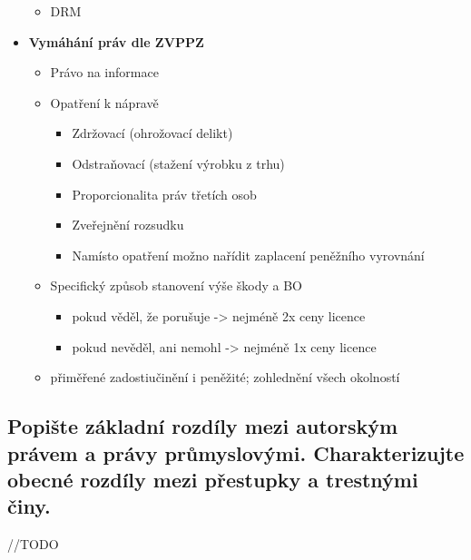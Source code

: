 \begin{itemize}
\begin{itemize}
\begin{itemize}
        \end{itemize}
        \item DRM
    \end{itemize}
    \item\textbf{Vymáhání práv dle ZVPPZ}
    \begin{itemize}
        \item Právo na informace
        \item Opatření k nápravě
        \begin{itemize}
            \item Zdržovací (ohrožovací delikt)
            \item Odstraňovací (stažení výrobku z trhu)
            \item Proporcionalita práv třetích osob
            \item Zveřejnění rozsudku
            \item Namísto opatření možno nařídit zaplacení peněžního vyrovnání
        \end{itemize}
        \item Specifický způsob stanovení výše škody a BO
        \begin{itemize}
            \item pokud věděl, že porušuje -> nejméně 2x ceny licence
            \item pokud nevěděl, ani nemohl -> nejméně 1x ceny licence
        \end{itemize}
        \item přiměřené zadostiučinění i peněžité; zohlednění všech okolností
    \end{itemize}
    
\end{itemize}

\subsection{Popište základní rozdíly mezi autorským právem a právy průmyslovými. Charakterizujte obecné rozdíly mezi přestupky a trestnými činy.}
//TODO

